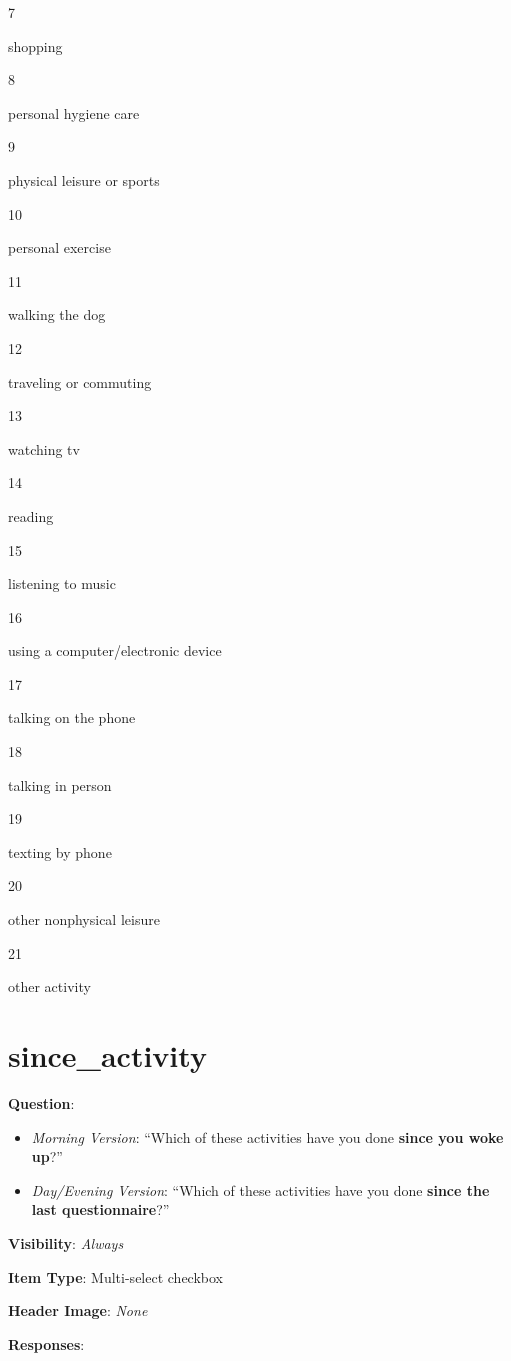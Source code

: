\documentclass[]{book}
\providecommand{\tightlist}{%
  \setlength{\itemsep}{0pt}\setlength{\parskip}{0pt}}
\begin{document}
7

shopping

8

personal hygiene care

9

physical leisure or sports

10

personal exercise

11

walking the dog

12

traveling or commuting

13

watching tv

14

reading

15

listening to music

16

using a computer/electronic device

17

talking on the phone

18

talking in person

19

texting by phone

20

other nonphysical leisure

21

other activity

\hypertarget{since_activity}{%
\section{since\_activity}\label{since_activity}}

\textbf{Question}:

\begin{itemize}
\tightlist
\item
  \emph{Morning Version}: ``Which of these activities have you done \textbf{since you woke up}?''
\item
  \emph{Day/Evening Version}: ``Which of these activities have you done \textbf{since the last questionnaire}?''
\end{itemize}

\textbf{Visibility}: \emph{Always}

\textbf{Item Type}: Multi-select checkbox

\textbf{Header Image}: \emph{None}

\textbf{Responses}:
\end{document}
